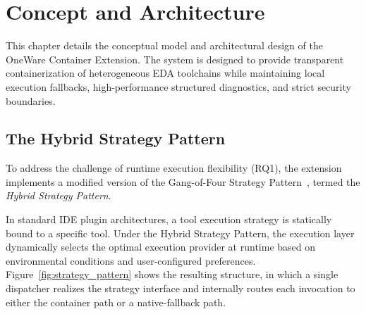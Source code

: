 
\chapter{Concept and Architecture}
\label{ch:concept}

This chapter details the conceptual model and architectural design of the OneWare Container Extension. The system is designed to provide transparent containerization of heterogeneous EDA toolchains while maintaining local execution fallbacks, high-performance structured diagnostics, and strict security boundaries.

\section{The Hybrid Strategy Pattern}
To address the challenge of runtime execution flexibility (RQ1), the extension implements a modified version of the Gang-of-Four Strategy Pattern~\cite{gamma1994design}, termed the \textit{Hybrid Strategy Pattern}. 

In standard IDE plugin architectures, a tool execution strategy is statically bound to a specific tool. Under the Hybrid Strategy Pattern, the execution layer dynamically selects the optimal execution provider at runtime based on environmental conditions and user-configured preferences. Figure~\ref{fig:strategy_pattern} shows the resulting structure, in which a single dispatcher realizes the strategy interface and internally routes each invocation to either the container path or a native-fallback path.

